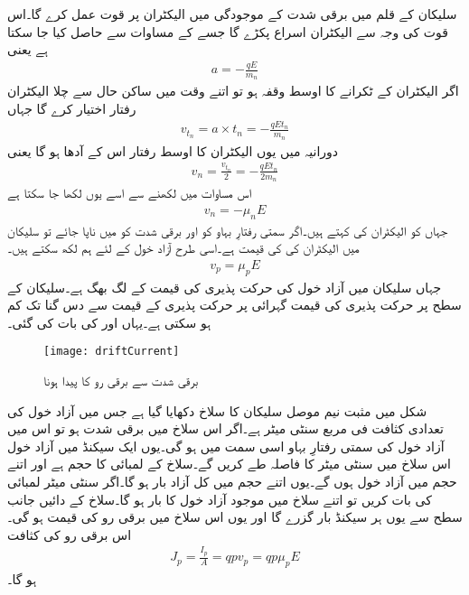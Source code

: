 سلیکان کے قلم میں برقی شدت  کے موجودگی میں الیکٹران پر قوت  عمل کرے گا۔اس قوت کی وجہ سے الیکٹران اسراع   پکڑے گا جسے  کے مساوات   سے حاصل کیا جا سکتا ہے یعنی
\begin{align*}
a=-\frac{q E}{m_n}
\end{align*}
اگر الیکٹران کے ٹکرانے کا اوسط وقفہ   ہو تو اتنے وقت میں ساکن حال سے چلا الیکٹران رفتار  اختیار کرے گا جہاں
\begin{align*}
v_{t_n}= a \times t_n = -\frac{q E t_n}{m_n}
\end{align*}
دورانیہ  میں یوں الیکٹران کا اوسط رفتار اس کے آدھا ہو گا یعنی
\begin{align*}
v_n =\frac{v_{t_n}}{2}=-\frac{q E t_n}{2 m_n}
\end{align*}
اس مساوات میں  لکھنے سے اسے یوں لکھا جا سکتا ہے
\begin{align}
v_n = -\mu_n E
\end{align}
جہاں   کو الیکٹران کی  کہتے ہیں۔اگر سمتی رفتارِ بہاو کو  اور برقی شدت کو  میں ناپا جائے تو سلیکان میں الیکٹران کی   کی قیمت  ہے۔اسی طرح آزاد خول کے لئے ہم لکھ سکتے ہیں۔
\begin{align}
v_p = \mu_p E
\end{align}
جہاں سلیکان میں آزاد خول کی حرکت پذیری  کی قیمت  کے لگ بھگ ہے۔سلیکان کے سطح پر حرکت پذیری کی قیمت گہرائی پر حرکت پذیری کے قیمت سے دس گنا تک کم ہو سکتی ہے۔یہاں  اور  کی بات کی گئی۔
\begin{figure}
\centering
\texttt{[image: driftCurrent]}
\caption{ برقی شدت سے برقی رو کا پیدا ہونا}
\label{شکل_برقی_شدت_سے_پیدا_برقی_رو}
\end{figure}
شکل   میں مثبت نیم موصل سلیکان کا سلاخ دکھایا گیا ہے جس میں آزاد خول کی تعدادی کثافت   فی مربع سنٹی میٹر ہے۔اگر اس سلاخ میں برقی شدت  ہو تو اس میں آزاد خول کی سمتی رفتارِ بہاو  اسی سمت میں ہو گی۔یوں ایک سیکنڈ میں آزاد خول اس سلاخ میں  سنٹی میٹر کا فاصلہ طے کریں گے۔سلاخ کے لمبائی  کا حجم  ہے اور اتنے حجم میں   آزاد خول ہوں گے۔یوں اتنے حجم میں کل آزاد بار   ہو گا۔اگر  سنٹی میٹر لمبائی کی بات کریں تو اتنے سلاخ میں موجود آزاد خول کا بار  ہو گا۔سلاخ کے دائیں جانب سطح   سے یوں ہر سیکنڈ  بار گزرے گا اور یوں اس سلاخ میں برقی رو  کی قیمت  ہو گی۔اس برقی رو کی کثافت 
\begin{align}
J_p = \frac{I_p}{A}=q p v_p = q p \mu_p E
\end{align}
ہو گا۔

